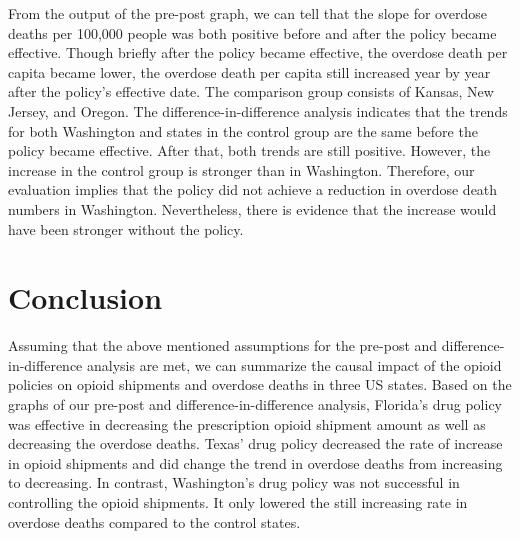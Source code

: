 \documentclass[12pt,letterpaper]{article}
\begin{document}
From the output of the pre-post graph, we can tell that the slope for overdose deaths per 100,000 people was both positive before and after the policy became effective. Though briefly after the policy became effective, the overdose death per capita became lower, the overdose death per capita still increased year by year after the policy's effective date. The comparison group consists of Kansas, New Jersey, and Oregon. The difference-in-difference analysis indicates that the trends for both Washington and states in the control group are the same before the policy  became effective. After that, both trends are still positive. However, the increase in the control group is stronger than in Washington. Therefore, our evaluation implies that the policy did not achieve a reduction in overdose death numbers in Washington. Nevertheless, there is evidence that the increase would have been stronger without the policy.


\section{Conclusion}

Assuming that the above mentioned assumptions for the pre-post and difference-in-difference analysis are met, we can summarize the causal impact of the opioid policies on opioid shipments and overdose deaths in three US states. Based on the graphs of our pre-post and difference-in-difference analysis, Florida's drug policy was effective in decreasing the prescription opioid shipment amount as well as decreasing the overdose deaths. Texas' drug policy decreased the rate of increase in opioid shipments and did change the trend in overdose deaths from increasing to decreasing. In contrast, Washington's drug policy was not successful in controlling the opioid shipments. It only lowered the still increasing rate in overdose deaths compared to the control states.
\end{document}
